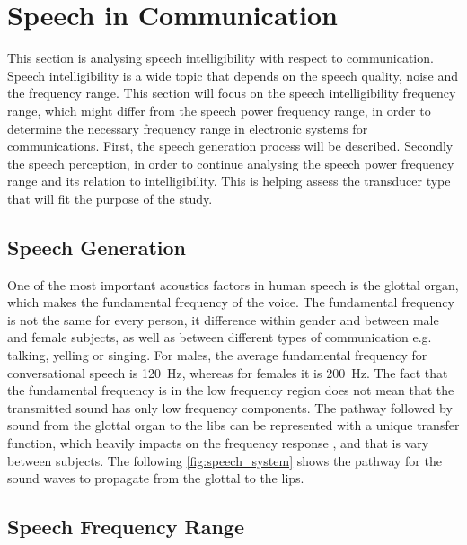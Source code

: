 \section{Speech in Communication}
\label{speech_in_comm}

This section is analysing speech intelligibility with respect to communication. Speech intelligibility is a wide topic that depends on the speech quality, noise and the frequency range. This section will focus on the speech intelligibility frequency range, which might differ from the speech power frequency range, in order to determine the necessary frequency range in electronic systems for communications. First, the speech generation process will be described. Secondly the speech perception, in order to continue analysing the speech power frequency range and its relation to intelligibility. This is helping assess the transducer type that will fit the purpose of the study.

\subsection{Speech Generation}

One of the most important acoustics factors in human speech is the glottal organ, which makes the fundamental frequency of the voice. The fundamental frequency is not the same for every person, it difference within gender and between male and female subjects, as well as between different types of communication e.g. talking, yelling or singing. For males, the average fundamental frequency for conversational speech is \SI{120}{\hertz}, whereas for females it is \SI{200}{\hertz}. The fact that the fundamental frequency is in the low frequency region does not mean that the transmitted sound has only low frequency components. The pathway followed by sound from the glottal organ to the libs can be represented with a unique transfer function, which heavily impacts on the frequency response \citep{pulkki2015}, and that is vary between subjects. The following \autoref{fig:speech_system} shows the pathway for the sound waves to propagate from the glottal to the lips.



\subsection{Speech Frequency Range}

